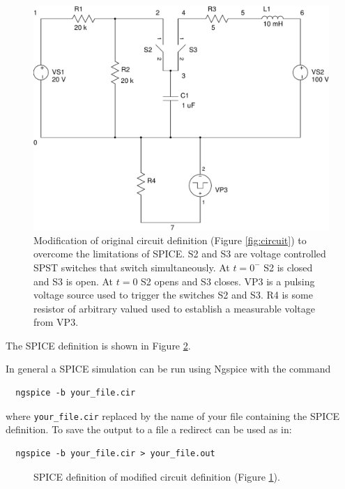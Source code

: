 \documentclass{article}
\begin{document}
\begin{figure}
\center
\includegraphics[scale=0.5]{spice/circuit-02}
\caption{Modification of original circuit definition (Figure \ref{fig:circuit})
to overcome the limitations of SPICE.
S2 and S3 are voltage controlled SPST switches that switch simultaneously.
At $t=0^-$ S2 is closed and S3 is open.  At $t=0$ S2 opens and S3 closes.
VP3 is a pulsing voltage source used to trigger the switches S2 and S3.
R4 is some resistor of arbitrary valued used to establish a measurable
voltage from VP3.
}
\label{fig:circuit-02}
\end{figure}

The SPICE definition is shown in Figure \ref{fig:spice}.

In general a SPICE simulation can be run using Ngspice with the command
\begin{verbatim}
  ngspice -b your_file.cir
\end{verbatim}
where \verb+your_file.cir+ replaced by the name of your file
containing the SPICE definition.
To save the output to a file a redirect can be used as in:
\begin{verbatim}
  ngspice -b your_file.cir > your_file.out
\end{verbatim}

\begin{figure}
\footnotesize

\caption{SPICE definition of modified circuit definition (Figure \ref{fig:circuit-02}).}
\label{fig:spice}
\end{figure}

\clearpage
\end{document}
